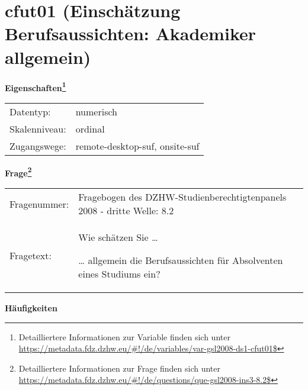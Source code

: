 
    \setcounter{footnote}{0}

    \vspace*{-1.8cm}
	\section{cfut01 (Einschätzung Berufsaussichten: Akademiker allgemein)}
	\label{section:cfut01}



    \vspace*{0.5cm}
    \noindent\textbf{Eigenschaften\footnote{Detailliertere Informationen zur Variable finden sich unter
		\url{https://metadata.fdz.dzhw.eu/\#!/de/variables/var-gsl2008-ds1-cfut01$}}}\\
	\begin{tabularx}{\hsize}{@{}lX}
	Datentyp: & numerisch \\
	Skalenniveau: & ordinal \\
	Zugangswege: &
	  remote-desktop-suf, 
	  onsite-suf
 \\
    \end{tabularx}



				\vspace*{0.5cm}
                \noindent\textbf{Frage\footnote{Detailliertere Informationen zur Frage finden sich unter
		              \url{https://metadata.fdz.dzhw.eu/\#!/de/questions/que-gsl2008-ins3-8.2$}}}\\
				\begin{tabularx}{\hsize}{@{}lX}
					Fragenummer: &
					  Fragebogen des DZHW-Studienberechtigtenpanels 2008 - dritte Welle:
					  8.2
 \\
					Fragetext: & Wie schätzen Sie …\par  … allgemein die Berufsaussichten für Absolventen eines Studiums ein? \\
				\end{tabularx}





        		\vspace*{0.5cm}
                \noindent\textbf{Häufigkeiten}

